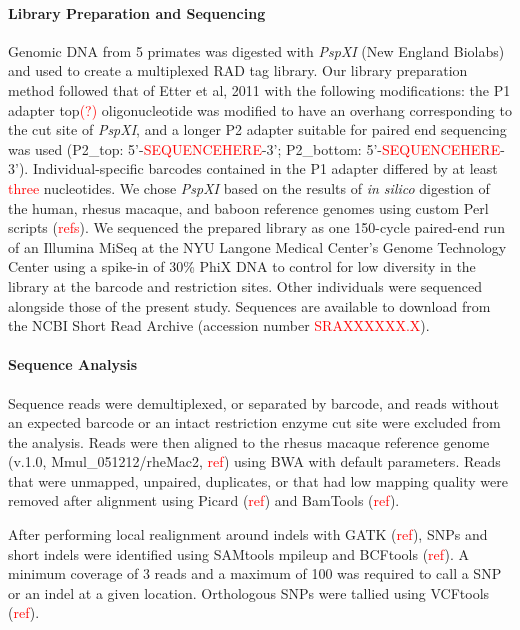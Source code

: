 \documentclass[12pt]{article}
\begin{document}
\paragraph{Library Preparation and Sequencing}

	Genomic DNA from 5 primates was digested with \emph{PspXI} (New England Biolabs) and used to create a multiplexed RAD tag library. Our library preparation method followed that of Etter et al, 2011 with the following modifications: the P1 adapter top\textcolor{red}{(?)} oligonucleotide was modified to have an overhang corresponding to the cut site of \emph{PspXI}, and a longer P2 adapter suitable for paired end sequencing was used (P2\_top: 5'-\textcolor{red}{SEQUENCEHERE}-3'; P2\_bottom: 5'-\textcolor{red}{SEQUENCEHERE}-3'). Individual-specific barcodes contained in the P1 adapter differed by at least \textcolor{red}{three} nucleotides. We chose \emph{PspXI} based on the results of \emph{in silico} digestion of the human, rhesus macaque, and baboon reference genomes using custom Perl scripts (\textcolor{red}{refs}). We sequenced the prepared library as one 150-cycle paired-end run of an Illumina MiSeq at the NYU Langone Medical Center's Genome Technology Center using a spike-in of 30\% PhiX DNA to control for low diversity in the library at the barcode and restriction sites. Other individuals were sequenced alongside those of the present study. Sequences are available to download from the NCBI Short Read Archive (accession number \textcolor{red}{SRAXXXXXX.X}).

\paragraph{Sequence Analysis}

	Sequence reads were demultiplexed, or separated by barcode, and reads without an expected barcode or an intact restriction enzyme cut site were excluded from the analysis. Reads were then aligned to the rhesus macaque reference genome (v.1.0, Mmul\_051212/rheMac2, \textcolor{red}{ref}) using BWA with default parameters. Reads that were unmapped, unpaired, duplicates, or that had low mapping quality were removed after alignment using Picard (\textcolor{red}{ref}) and BamTools (\textcolor{red}{ref}). 

	After performing local realignment around indels with GATK (\textcolor{red}{ref}), SNPs and short indels were identified using SAMtools mpileup and BCFtools (\textcolor{red}{ref}). A minimum coverage of 3 reads and a maximum of 100 was required to call a SNP or an indel at a given location. Orthologous SNPs were tallied using VCFtools (\textcolor{red}{ref}).
	
\end{document}
